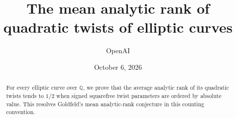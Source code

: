\documentclass[11pt]{article}
\title{The mean analytic rank of quadratic twists of elliptic curves}
\author{OpenAI}
\date{October 6, 2026}
\numberwithin{equation}{section}
\theoremstyle{definition}
\theoremstyle{remark}
\newcommand{\Q}{\mathbb Q}
\begin{document}
\maketitle
\begin{abstract}
For every elliptic curve over \(\Q\), we prove that the average analytic
rank of its quadratic twists tends to \(1/2\) when signed squarefree twist
parameters are ordered by absolute value. This resolves Goldfeld's mean
analytic-rank conjecture in this counting convention.
\end{abstract}











\end{document}
